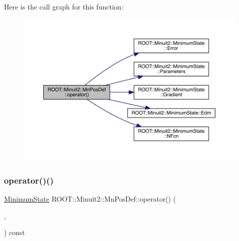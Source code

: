 Here is the call graph for this function\+:\nopagebreak
\begin{figure}[H]
\begin{center}
\leavevmode
\includegraphics[width=350pt]{d0/dab/classROOT_1_1Minuit2_1_1MnPosDef_a5a550c841e9b62d3c09cdf9df61a88f4_cgraph}
\end{center}
\end{figure}
\mbox{\label{classROOT_1_1Minuit2_1_1MnPosDef_a5a550c841e9b62d3c09cdf9df61a88f4}} 
\subsubsection{\texorpdfstring{operator()()}{operator()()}\hspace{0.1cm}{\footnotesize\ttfamily [2/4]}}
{\footnotesize\ttfamily \mbox{\hyperlink{classROOT_1_1Minuit2_1_1MinimumState}{Minimum\+State}} R\+O\+O\+T\+::\+Minuit2\+::\+Mn\+Pos\+Def\+::operator() (\begin{DoxyParamCaption}\item[{const \mbox{\hyperlink{classROOT_1_1Minuit2_1_1MinimumState}{Minimum\+State}} \&}]{,  }\item[{const \mbox{\hyperlink{classROOT_1_1Minuit2_1_1MnMachinePrecision}{Mn\+Machine\+Precision}} \&}]{ }\end{DoxyParamCaption}) const}

\mbox{\label{classROOT_1_1Minuit2_1_1MnPosDef_ace62b61f17edf0c57ef824003b99b9ec}} 
